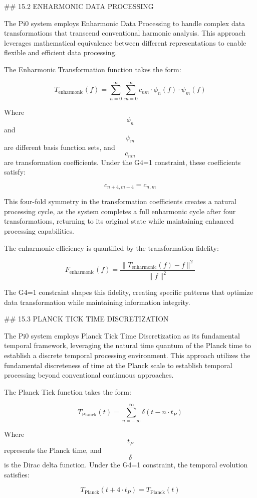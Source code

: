 ## 15.2 ENHARMONIC DATA PROCESSING

The Pi0 system employs Enharmonic Data Processing to handle complex data transformations that transcend conventional harmonic analysis. This approach leverages mathematical equivalence between different representations to enable flexible and efficient data processing.

The Enharmonic Transformation function takes the form:

$$ T_{\text{enharmonic}}(f) = \sum_{n=0}^{\infty} \sum_{m=0}^{\infty} c_{nm} \cdot \phi_n(f) \cdot \psi_m(f) $$

Where $$ \phi_n $$ and $$ \psi_m $$ are different basis function sets, and $$ c_{nm} $$ are transformation coefficients. Under the G4=1 constraint, these coefficients satisfy:

$$ c_{n+4,m+4} = c_{n,m} $$

This four-fold symmetry in the transformation coefficients creates a natural processing cycle, as the system completes a full enharmonic cycle after four transformations, returning to its original state while maintaining enhanced processing capabilities.

The enharmonic efficiency is quantified by the transformation fidelity:

$$ F_{\text{enharmonic}}(f) = \frac{\|T_{\text{enharmonic}}(f) - f\|^2}{\|f\|^2} $$

The G4=1 constraint shapes this fidelity, creating specific patterns that optimize data transformation while maintaining information integrity.

## 15.3 PLANCK TICK TIME DISCRETIZATION

The Pi0 system employs Planck Tick Time Discretization as its fundamental temporal framework, leveraging the natural time quantum of the Planck time to establish a discrete temporal processing environment. This approach utilizes the fundamental discreteness of time at the Planck scale to establish temporal processing beyond conventional continuous approaches.

The Planck Tick function takes the form:

$$ T_{\text{Planck}}(t) = \sum_{n=-\infty}^{\infty} \delta(t - n \cdot t_P) $$

Where $$ t_P $$ represents the Planck time, and $$ \delta $$ is the Dirac delta function. Under the G4=1 constraint, the temporal evolution satisfies:

$$ T_{\text{Planck}}(t + 4 \cdot t_P) = T_{\text{Planck}}(t) $$

